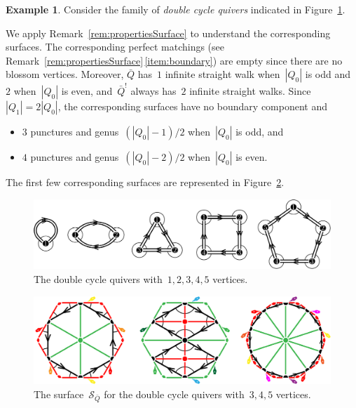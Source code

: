 \documentclass{amsart}
\theoremstyle{definition}
\newtheorem{example}[theorem]{Example}
\newcommand{\fref}[1]{Figure~\ref{#1}} %
\newcommand{\darkblue}{\color{darkblue}} %
\newcommand{\defn}[1]{\textsl{\darkblue #1}} %
\newcommand{\surface}{\mathcal{S}} %
\newcommand{\koszul}{^!} %
\begin{document}
\begin{example}
\label{exm:doubleCycle}
Consider the family of \defn{double cycle quivers} indicated in \fref{fig:doubleCyclesQuivers}.

We apply Remark~\ref{rem:propertiesSurface} to understand the corresponding surfaces.
The corresponding perfect matchings (see Remark~\ref{rem:propertiesSurface}\,\eqref{item:boundary}) are empty since there are no blossom vertices.
Moreover, $\bar Q$ has~$1$ infinite straight walk when~$|Q_0|$ is odd and~$2$ when~$|Q_0|$ is even, and~$\bar Q\koszul$ always has~$2$ infinite straight walks.
Since~$|Q_1| = 2|Q_0|$, the corresponding surfaces have no boundary component and
\begin{itemize}
\item $3$ punctures and genus~$(|Q_0|-1)/2$ when~$|Q_0|$ is odd, and 
\item $4$ punctures and genus~$(|Q_0|-2)/2$ when~$|Q_0|$ is even.
\end{itemize}
The first few corresponding surfaces are represented in \fref{fig:doubleCyclesSurfaces}.

\begin{figure}[h]
	\capstart
	\centerline{\includegraphics[scale=.45]{doubleCyclesQuivers}}
	\caption{The double cycle quivers with~$1, 2, 3, 4, 5$ vertices.}
	\label{fig:doubleCyclesQuivers}
\end{figure}

\begin{figure}[h]
	\capstart
	\centerline{\includegraphics[scale=.7]{doubleCyclesSurfaces}}
	\caption{The surface~$\surface_{\bar Q}$ for the double cycle quivers with~$3, 4, 5$ vertices.}
	\label{fig:doubleCyclesSurfaces}
\end{figure}
\end{example}
\end{document}
